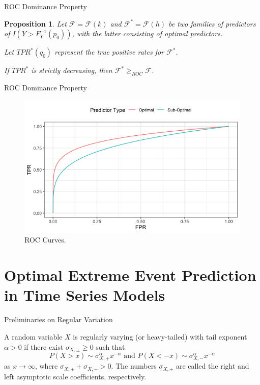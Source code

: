 \documentclass{beamer}
\newtheorem{proposition}{Proposition}
\begin{document}
\begin{frame}{ROC Dominance Property}
    \begin{proposition}
        Let $\mathcal{F} = \mathcal{F}(k)$ and $\mathcal{F}^* = \mathcal{F}(h)$ be two families of predictors of $I(Y > F_Y^{-1}(p_0))$, with the latter consisting of optimal predictors.

        \medskip
        
        Let $TPR^*(q_0)$ represent the true positive rates for $\mathcal{F}^*$.

        \medskip

        If $TPR^*$ is strictly decreasing, then $\mathcal{F}^* \ge_{ROC} \mathcal{F}$.
    \end{proposition}
\end{frame}

\begin{frame}{ROC Dominance Property}
    \begin{figure}[h!]
        \centering
        \includegraphics[scale=0.4]{roc_curves.png}
        \caption{ROC Curves.}
        \label{fig:roc_curves}
    \end{figure}
\end{frame}

\section{Optimal Extreme Event Prediction in Time Series Models}

\begin{frame}{Preliminaries on Regular Variation}
    \begin{definition}
        A random variable $X$ is regularly varying (or heavy-tailed) with tail exponent $\alpha > 0$ if there exist $\sigma_{X, \pm} \ge 0$ such that
        \begin{equation*}\label{eq:tail_conds}
            P(X > x) \sim \sigma_{X, +}^{\alpha}x^{-\alpha} \text{ and } P(X < -x) \sim \sigma_{X, -}^{\alpha}x^{-\alpha}
        \end{equation*}
        as $x \to \infty$, where $\sigma_{X, +} + \sigma_{X, -} > 0$. The numbers $\sigma_{X, \pm}$ are called the right and left asymptotic scale coefficients, respectively.
    \end{definition}
\end{frame}
\end{document}
